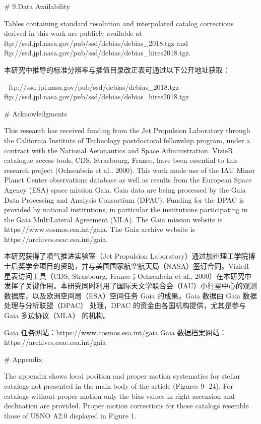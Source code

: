 # 9.Data Availability

Tables containing standard resolution and interpolated catalog corrections derived in this work are publicly available at ftp://ssd.jpl.nasa.gov/pub/ssd/debias/debias_2018.tgz and ftp://ssd.jpl.nasa.gov/pub/ssd/debias/debias_hires2018.tgz.

本研究中推导的标准分辨率与插值目录改正表可通过以下公开地址获取：

- ftp://ssd.jpl.nasa.gov/pub/ssd/debias/debias_2018.tgz
- ftp://ssd.jpl.nasa.gov/pub/ssd/debias/debias_hires2018.tgz

# Acknowledgments

This research has received funding from the Jet Propulsion Laboratory through the California Institute of Technology postdoctoral fellowship program, under a contract with the National Aeronautics and Space Administration. VizieR catalogue access tools, CDS, Strasbourg, France, have been essential to this research project (Ochsenbein et al., 2000). This work made use of the IAU Minor Planet Center observations database as well as results from the European Space Agency (ESA) space mission Gaia. Gaia data are being processed by the Gaia Data Processing and Analysis Consortium (DPAC). Funding for the DPAC is provided by national institutions, in particular the institutions participating in the Gaia MultiLateral Agreement (MLA). The Gaia mission website is https://www.cosmos.esa.int/gaia. The Gaia archive website is https://archives.esac.esa.int/gaia.

本研究获得了喷气推进实验室（Jet Propulsion Laboratory）通过加州理工学院博士后奖学金项目的资助，并与美国国家航空航天局（NASA）签订合同。VizieR 星表访问工具（CDS, Strasbourg, France；Ochsenbein et al., 2000）在本研究中发挥了关键作用。本研究同时利用了国际天文学联合会（IAU）小行星中心的观测数据库，以及欧洲空间局（ESA）空间任务 Gaia 的成果。Gaia 数据由 Gaia 数据处理与分析联盟（DPAC） 处理，DPAC 的资金由各国机构提供，尤其是参与 Gaia 多边协议（MLA） 的机构。

Gaia 任务网站：https://www.cosmos.esa.int/gaia
 Gaia 数据档案网站：https://archives.esac.esa.int/gaia

# Appendix

The appendix shows local position and proper motion systematics for stellar catalogs not presented in the main body of the article (Figures 9- 24). For catalogs without proper motion only the bias values in right ascension and declination are provided. Proper motion corrections for those catalogs resemble those of USNO A2.0 displayed in Figure 1.

